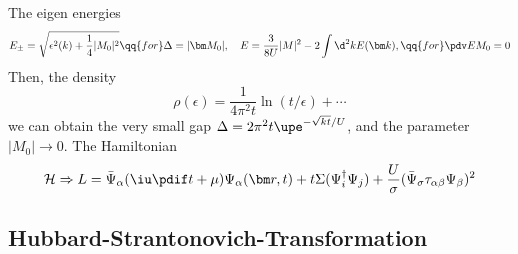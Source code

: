 The eigen energies
\[
  E_\pm = \sqrt{\epsilon^2(k) + \frac14|M_0|^2} \qq{for} \Delta = |\bm M_0|,
  \quad
  E = \frac3{8U} |M|^2 - 2\int \d^2k E(\bm k), \qq{for} \pdv E{M_0} = 0
\]
Then, the density
\[
  \rho(\epsilon) = \frac1{4\pi^2t} \ln(t/\epsilon) + \cdots
\]
we can obtain the very small gap $\Delta = 2\pi^2t \upe^{-\sqrt{kt}/U}$,
and the parameter $|M_0| \to 0$.
The Hamiltonian
\begin{equation}
  \mathcal H  \Rightarrow L = \bar\Psi_\alpha(\iu\pdif t + \mu)
    \Psi_\alpha(\bm r, t)
  + t\Sigma(\Psi_i^\dagger\Psi_j)
  + \frac U\sigma (\bar\Psi_\sigma\tau_{\alpha\beta}\Psi_\beta)^2
\end{equation}

\subsection{Hubbard-Strantonovich-Transformation}

